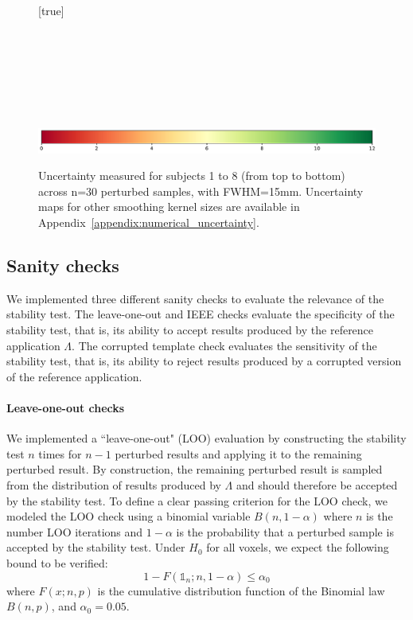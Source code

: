 \documentclass[lettersize,journal]{IEEEtran}
\begin{document}
\begin{figure}
    \centering
    [true] \\
     \\
     \\
     \\
     \\
     \\
     \\
     \\
    \includegraphics*[width=.6\linewidth]{figures/colorbar_sigbit.pdf}
    \caption{Uncertainty measured for subjects 1 to 8 (from top to bottom) across n=30 perturbed samples, with FWHM=15mm. Uncertainty maps for other smoothing kernel sizes are available in Appendix~\ref{appendix:numerical_uncertainty}.}
    \label{fig:uncertainty-maps}
\end{figure}

\subsection{Sanity checks}

We implemented three different sanity checks to evaluate the relevance of the stability test.
The leave-one-out and IEEE checks evaluate the specificity of the stability test, that is, its ability
to accept results produced by the reference application $\Lambda$. The corrupted template check evaluates
the sensitivity of the stability test, that is, its ability to reject results produced by a corrupted version of the reference application.

\paragraph{Leave-one-out checks} We implemented a ``leave-one-out" (LOO) evaluation by constructing the stability test $n$ times for $n-1$ perturbed results and applying it to the remaining perturbed result. By construction, the remaining perturbed result is sampled from the distribution of results produced by $\Lambda$ and should therefore be accepted by the stability test.
To define a clear passing criterion for the LOO check, we modeled the LOO check using a binomial variable $B(n,1-\alpha)$ where $n$ is the number LOO iterations and $1-\alpha$ is the probability that a perturbed sample is accepted by the stability test. Under $H_0$ for all voxels, we expect the following bound to be verified:
\[
    1-F(\mathds{1}_n;n,1-\alpha) \leq \alpha_0
\]
where $F(x;n,p)$ is the cumulative distribution function of the Binomial law $B(n,p)$, and $\alpha_0=0.05$.
\end{document}
